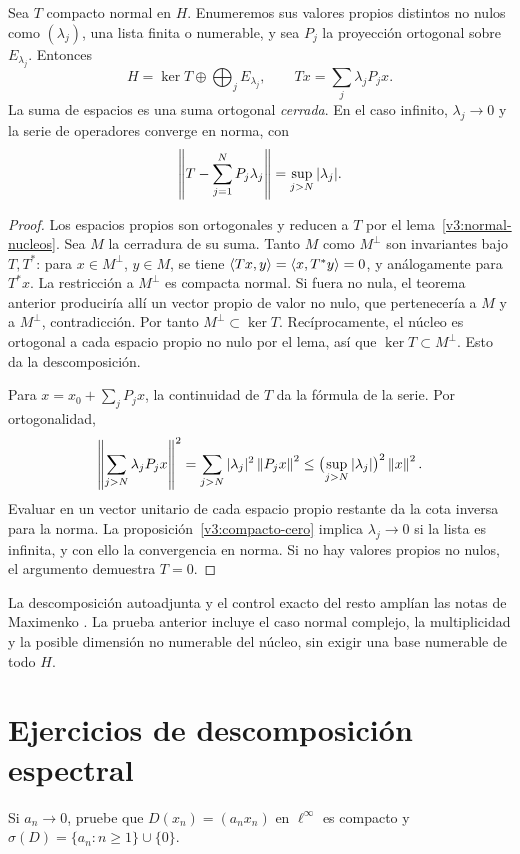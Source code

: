 \begin{teorema}\label{v3:espectral-compacto}
Sea $T$ compacto normal en $H$. Enumeremos sus valores propios distintos no nulos como $(\lambda_j)$, una lista finita o numerable, y sea $P_j$ la proyección ortogonal sobre $E_{\lambda_j}$. Entonces
\[H=\ker T\oplus\bigoplus_j E_{\lambda_j},\qquad
Tx=\sum_j\lambda_jP_jx.
\]
La suma de espacios es una suma ortogonal \emph{cerrada}. En el caso infinito, $\lambda_j\to0$ y la serie de operadores converge en norma, con
\[\left\lVert T-\sum_{j=1}^NP_j\lambda_j\right\rVert=\sup_{j>N}|\lambda_j|.
\]
\end{teorema}
\begin{proof}
Los espacios propios son ortogonales y reducen a $T$ por el lema~\ref{v3:normal-nucleos}. Sea $M$ la cerradura de su suma. Tanto $M$ como $M^\perp$ son invariantes bajo $T,T^*$: para $x\in M^\perp$, $y\in M$, se tiene $\left\langle Tx,y\right\rangle=\left\langle x,T^*y\right\rangle=0$, y análogamente para $T^*x$. La restricción a $M^\perp$ es compacta normal. Si fuera no nula, el teorema anterior produciría allí un vector propio de valor no nulo, que pertenecería a $M$ y a $M^\perp$, contradicción. Por tanto $M^\perp\subset\ker T$. Recíprocamente, el núcleo es ortogonal a cada espacio propio no nulo por el lema, así que $\ker T\subset M^\perp$. Esto da la descomposición.

Para $x=x_0+\sum_jP_jx$, la continuidad de $T$ da la fórmula de la serie. Por ortogonalidad,
\[\left\lVert\sum_{j>N}\lambda_jP_jx\right\rVert^2
=\sum_{j>N}|\lambda_j|^2\left\lVert P_jx\right\rVert^2
\le\bigl(\sup_{j>N}|\lambda_j|\bigr)^2\left\lVert x\right\rVert^2.
\]
Evaluar en un vector unitario de cada espacio propio restante da la cota inversa para la norma. La proposición~\ref{v3:compacto-cero} implica $\lambda_j\to0$ si la lista es infinita, y con ello la convergencia en norma. Si no hay valores propios no nulos, el argumento demuestra $T=0$.
\end{proof}
La descomposición autoadjunta y el control exacto del resto amplían las notas de Maximenko \cite{maxcompactos}. La prueba anterior incluye el caso normal complejo, la multiplicidad y la posible dimensión no numerable del núcleo, sin exigir una base numerable de todo $H$.

\section{Ejercicios de descomposición espectral}
\begin{ejercicio}\label{ej:v3-l11-1}
Si $a_n\to0$, pruebe que $D(x_n)=(a_nx_n)$ en $\ell^\infty$ es compacto y $\sigma(D)=\{a_n:n\ge1\}\cup\{0\}$.
\end{ejercicio}



